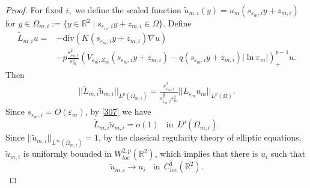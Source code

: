 \documentclass[12pt,reqno]{amsart}
\numberwithin{equation}{section}
\theoremstyle{definition}
\theoremstyle{remark}
\begin{document}
\begin{proof}
For fixed $ i, $ we define the scaled function $ \tilde{u}_{m,i}(y)=u_m(s_{\varepsilon_m, i}y+z_{m,i}) $ for $ y\in \Omega_{m,i}:=\{y\in\mathbb{R}^2\mid s_{\varepsilon_m, i}y+z_{m,i}\in \Omega\} $.
Define
\begin{equation*}
\begin{split}
\tilde{L}_{m,i}u=&-\text{div}\left (K(s_{\varepsilon_m, i}y+z_{m,i})\nabla u\right )\\
&-p\frac{s_{\varepsilon_m,i}^2}{\varepsilon_m^2}\left (V_{\varepsilon_m, Z_m}(s_{\varepsilon_m, i}y+z_{m,i})-q(s_{\varepsilon_m, i}y+z_{m,i})|\ln\varepsilon_m|\right )^{p-1}_+ u.
\end{split}
\end{equation*}
Then
\begin{equation*}
\begin{split}
||\tilde{L}_{m,i}\tilde{u}_{m,i}||_{L^p(\Omega_{m,i})}
=\frac{s_{\varepsilon_m, i}^2}{s_{\varepsilon_m, i}^{\frac{2}{p}}\varepsilon_m^2}||L_{\varepsilon_m}u_m||_{L^p(\Omega)}.
\end{split}
\end{equation*}
Since  $ s_{\varepsilon_m, i}=O(\varepsilon_m) $, by \eqref{307} we have
\begin{equation*}
\tilde{L}_{m,i}\tilde{u}_{m,i}=o(1)\ \ \ \  \text{in}\ \ L^p(\Omega_{m,i}).
\end{equation*}
Since $ ||\tilde{u}_{m,i}||_{L^\infty(\Omega_{m,i})}=1 $, by the classical regularity theory of  elliptic equations, $ \tilde{u}_{m,i} $ is uniformly bounded in $ W^{2,p}_{loc}(\mathbb{R}^2) $, which implies that there is $u_i$ such that
\begin{equation*}
\tilde{u}_{m,i}\to u_i\ \ \ \ \text{in}\ \ C^1_{loc}(\mathbb{R}^2).
\end{equation*}


\end{proof}
\end{document}
